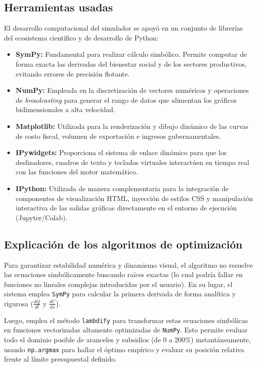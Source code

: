 \documentclass[12pt, a4paper]{article}
\begin{document}
\subsection{Herramientas usadas}
El desarrollo computacional del simulador se apoyó en un conjunto de librerías del ecosistema científico y de desarrollo de Python:
\begin{itemize}
    \item \textbf{SymPy:} Fundamental para realizar cálculo simbólico. Permite computar de forma exacta las derivadas del bienestar social y de los sectores productivos, evitando errores de precisión flotante.
    \item \textbf{NumPy:} Empleada en la discretización de vectores numéricos y operaciones de \textit{broadcasting} para generar el rango de datos que alimentan los gráficos bidimensionales a alta velocidad.
    \item \textbf{Matplotlib:} Utilizada para la renderización y dibujo dinámico de las curvas de costo fiscal, volumen de exportación e ingresos gubernamentales.
    \item \textbf{IPywidgets:} Proporciona el sistema de enlace dinámico para que los deslizadores, cuadros de texto y teclados virtuales interactúen en tiempo real con las funciones del motor matemático.
    \item \textbf{IPython:} Utilizada de manera complementaria para la integración de componentes de visualización HTML, inyección de estilos CSS y manipulación interactiva de las salidas gráficas directamente en el entorno de ejecución (Jupyter/Colab).
\end{itemize}

\subsection{Explicación de los algoritmos de optimización}
Para garantizar estabilidad numérica y dinamismo visual, el algoritmo no resuelve las ecuaciones simbólicamente buscando raíces exactas (lo cual podría fallar en funciones no lineales complejas introducidas por el usuario). En su lugar, el sistema emplea \texttt{SymPy} para calcular la primera derivada de forma analítica y rigurosa ($\frac{dQ}{dt}$ y $\frac{dC}{ds}$). 

Luego, emplea el método \texttt{lambdify} para transformar estas ecuaciones simbólicas en funciones vectorizadas altamente optimizadas de \texttt{NumPy}. Esto permite evaluar todo el dominio posible de aranceles y subsidios (de $0$ a $200\%$) instantáneamente, usando \texttt{np.argmax} para hallar el óptimo empírico y evaluar su posición relativa frente al límite presupuestal definido.
\end{document}

